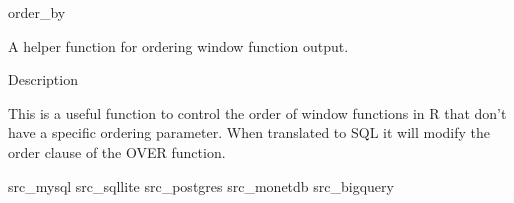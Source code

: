


order\_by 

A helper function for ordering window function output.

Description

This is a useful function to control the order of window functions in R that don’t have a specific
ordering parameter. When translated to SQL it will modify the order clause of the OVER function.


src_mysql
src_sqllite
src_postgres
src_monetdb
src_bigquery

